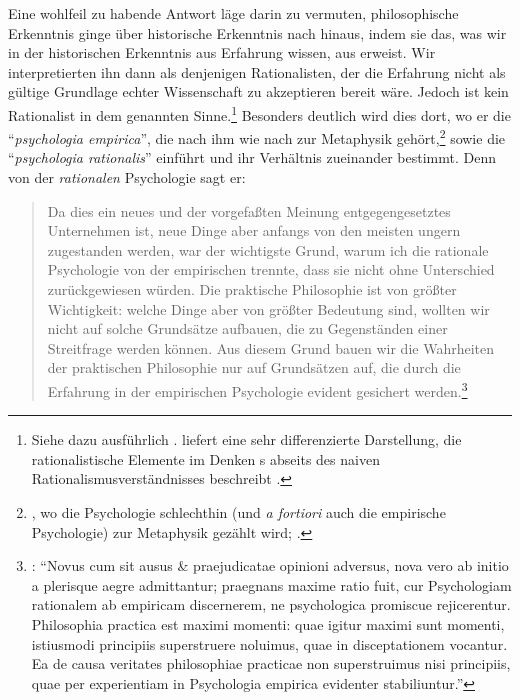 Eine wohlfeil zu habende Antwort läge darin zu vermuten, philosophische
Erkenntnis ginge über historische Erkenntnis nach
 hinaus, indem
sie das, was wir in der historischen Erkenntnis aus Erfahrung wissen, aus
 erweist. Wir interpretierten ihn dann als
denjenigen Rationalisten, der die Erfahrung nicht als gültige Grundlage echter
Wissenschaft zu akzeptieren bereit wäre. Jedoch ist
 kein
Rationalist in dem genannten Sinne.\footnote{Siehe dazu ausführlich
\cite{Kreimendahl:EmpiristischeElementeimDenkenChristianWolffs2007}.
liefert eine sehr differenzierte Darstellung, die rationalistische Elemente im
Denken s
abseits des naiven Rationalismusverständnisses beschreibt
\parencite[vgl.][]{Ecole:Enquelssenspeut-ondirequeWolffestrationaliste?1979}.}
Besonders deutlich wird dies dort, wo er die \enquote{\emph{psychologia
empirica}}, die nach ihm wie nach
 zur Metaphysik
gehört,\footnote{\cite[Vgl.][\S~99]{Wolff:Discursuspraeliminarisdephilosophiaingenere1996},
wo die Psychologie schlechthin (und \emph{a fortiori} auch die empirische
Psychologie) zur Metaphysik gezählt wird;
\cite[][\S\S~501--503]{Baumgarten:Metaphysica---Metaphysik2011}.} sowie die
\enquote{\emph{psychologia rationalis}} einführt und ihr Verhältnis zueinander
bestimmt. Denn von der \emph{rationalen} Psychologie sagt er:
\begin{quote}
  Da dies ein neues und der vorgefaßten Meinung entgegengesetztes
  Unternehmen ist, neue Dinge aber anfangs von den meisten ungern zugestanden
  werden, war der wichtigste Grund, warum ich die rationale Psychologie von
  der empirischen trennte, dass sie nicht ohne Unterschied zurückgewiesen
  würden. {\punkt} Die praktische Philosophie ist von größter Wichtigkeit:
  welche Dinge aber von größter Bedeutung sind, wollten wir nicht auf solche
  Grundsätze aufbauen, die zu Gegenständen einer Streitfrage werden können. Aus
  diesem Grund bauen wir die Wahrheiten der praktischen Philosophie nur auf
  Grundsätzen auf, die durch die Erfahrung in der empirischen Psychologie evident gesichert
  werden.\footnote{\cite[][\S~112]{Wolff:Discursuspraeliminarisdephilosophiaingenere1996}:
  \enquote{Novus cum sit ausus {\&} praejudicatae opinioni adversus, nova vero
  ab initio a plerisque aegre admittantur; praegnans maxime ratio fuit, cur
  Psychologiam rationalem ab empiricam discernerem, ne psychologica promiscue
  rejicerentur. {\punkt} Philosophia practica est maximi momenti: quae igitur
  maximi sunt momenti, istiusmodi principiis superstruere noluimus, quae in
  disceptationem vocantur. Ea de causa veritates philosophiae practicae non
  superstruimus nisi principiis, quae per experientiam in Psychologia empirica
  evidenter stabiliuntur.}}
\end{quote}
